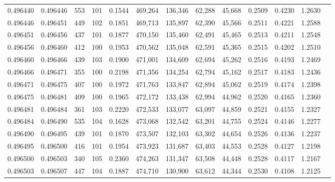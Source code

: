 \begin{tabular}{rrrrrrrrrrrrr}
0.496440 & 0.496446 &   553 & 101 &                                     0.1544 & 469,264 & 136,346 &  62,288 &  45,668 & 0.2509 & 0.4230 & 1.2630 \\
0.496446 & 0.496451 &   449 & 102 &                                     0.1851 & 469,713 & 135,897 &  62,390 &  45,566 & 0.2511 & 0.4221 & 1.2588 \\
0.496451 & 0.496456 &   437 & 101 &                                     0.1877 & 470,150 & 135,460 &  62,491 &  45,465 & 0.2513 & 0.4211 & 1.2548 \\
0.496456 & 0.496460 &   412 & 100 &                                     0.1953 & 470,562 & 135,048 &  62,591 &  45,365 & 0.2515 & 0.4202 & 1.2510 \\
0.496460 & 0.496466 &   439 & 103 &                                     0.1900 & 471,001 & 134,609 &  62,694 &  45,262 & 0.2516 & 0.4193 & 1.2469 \\
0.496466 & 0.496471 &   355 & 100 &                                     0.2198 & 471,356 & 134,254 &  62,794 &  45,162 & 0.2517 & 0.4183 & 1.2436 \\
0.496471 & 0.496475 &   407 & 100 &                                     0.1972 & 471,763 & 133,847 &  62,894 &  45,062 & 0.2519 & 0.4174 & 1.2398 \\
0.496475 & 0.496481 &   409 & 100 &                                     0.1965 & 472,172 & 133,438 &  62,994 &  44,962 & 0.2520 & 0.4165 & 1.2360 \\
0.496481 & 0.496484 &   361 & 103 &                                     0.2220 & 472,533 & 133,077 &  63,097 &  44,859 & 0.2521 & 0.4155 & 1.2327 \\
0.496484 & 0.496490 &   535 & 104 &                                     0.1628 & 473,068 & 132,542 &  63,201 &  44,755 & 0.2524 & 0.4146 & 1.2277 \\
0.496490 & 0.496495 &   439 & 101 &                                     0.1870 & 473,507 & 132,103 &  63,302 &  44,654 & 0.2526 & 0.4136 & 1.2237 \\
0.496495 & 0.496500 &   416 & 101 &                                     0.1954 & 473,923 & 131,687 &  63,403 &  44,553 & 0.2528 & 0.4127 & 1.2198 \\
0.496500 & 0.496503 &   340 & 105 &                                     0.2360 & 474,263 & 131,347 &  63,508 &  44,448 & 0.2528 & 0.4117 & 1.2167 \\
0.496503 & 0.496507 &   447 & 104 &                                     0.1887 & 474,710 & 130,900 &  63,612 &  44,344 & 0.2530 & 0.4108 & 1.2125 \\

\end{tabular}
